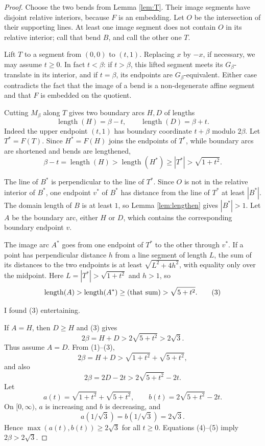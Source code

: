 \documentclass[12pt]{article}
\newcommand{\ellg}{\operatorname{length}}
\newcommand{\review}[1]{\begin{reviewbox}#1\end{reviewbox}}
\begin{document}
\begin{proof}
Choose the two bends from Lemma \ref{lem:T}.  Their image segments have
disjoint relative interiors, because \(F\) is an embedding.  Let \(O\) be
the intersection of their supporting lines.  At least one image segment
does not contain \(O\) in its relative interior; call that bend \(B\), and
call the other one \(T\).

Lift \(T\) to a segment from \((0,0)\) to \((t,1)\).  Replacing \(x\) by
\(-x\), if necessary, we may assume \(t\ge0\).  In fact \(t<\beta\): if
\(t>\beta\), this lifted segment meets its \(G_\beta\)-translate in its
interior, and if \(t=\beta\), its endpoints are \(G_\beta\)-equivalent.
Either case contradicts the fact that the image of a bend is a
non-degenerate affine segment and that \(F\) is embedded on the quotient.

Cutting \(M_\beta\) along \(T\) gives two boundary arcs \(H,D\) of lengths
\[
        \ellg(H)=\beta-t,\qquad \ellg(D)=\beta+t.        \tag{1}
\]
Indeed the upper endpoint \((t,1)\) has boundary coordinate \(t+\beta\)
modulo \(2\beta\).  Let \(T^*=F(T)\).  Since \(H^*=F(H)\) joins the
endpoints of \(T^*\), while boundary arcs are shortened and bends are
lengthened,
\[
        \beta-t=\ellg(H)>\ellg(H^*)\ge |T^*|>\sqrt{1+t^2}.       \tag{2}
\]

The line of \(B^*\) is perpendicular to the line of \(T^*\).  Since \(O\)
is not in the relative interior of \(B^*\), one endpoint \(v^*\) of
\(B^*\) has distance from the line of \(T^*\) at least \(|B^*|\).  The
domain length of \(B\) is at least \(1\), so Lemma \ref{lem:lengthen}
gives \(|B^*|>1\).  Let \(A\) be the boundary arc, either \(H\) or \(D\),
which contains the corresponding boundary endpoint \(v\).

The image arc \(A^*\) goes from one endpoint of \(T^*\) to the other
through \(v^*\).  If a point has perpendicular distance \(h\) from a line
segment of length \(L\), the sum of its distances to the two endpoints is
at least \(\sqrt{L^2+4h^2}\), with equality only over the midpoint.  Here
\(L=|T^*|>\sqrt{1+t^2}\) and \(h>1\), so
\[
        \ellg(A)>\ellg(A^*)\ge
        \hbox{(that sum)}>\sqrt{5+t^2}.                  \tag{3}
\]

\review{I found (3) entertaining.}

If \(A=H\), then \(D\ge H\) and (3) gives
\[
        2\beta=H+D>2\sqrt{5+t^2}>2\sqrt3.
\]
Thus assume \(A=D\).  From (1)--(3),
\[
 2\beta=H+D>\sqrt{1+t^2}+\sqrt{5+t^2},                         \tag{4}
\]
and also
\[
 2\beta=2D-2t>2\sqrt{5+t^2}-2t.                                \tag{5}
\]
Let
\[
 a(t)=\sqrt{1+t^2}+\sqrt{5+t^2},\qquad
 b(t)=2\sqrt{5+t^2}-2t .
\]
On \([0,\infty)\), \(a\) is increasing and \(b\) is decreasing, and
\[
        a(1/\sqrt3)=b(1/\sqrt3)=2\sqrt3 .
\]
Hence \(\max(a(t),b(t))\ge2\sqrt3\) for all \(t\ge0\).  Equations
(4)--(5) imply \(2\beta>2\sqrt3\).
\end{proof}
\end{document}
